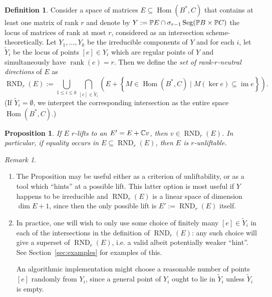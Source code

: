 \documentclass[a4paper,10pt]{article}
\def\zav#1{\left(#1\right)}
\def\set#1{\left\{#1\right\}}
\DeclareMathOperator{\Hom}{Hom}\let\hom\Hom
\DeclareMathOperator{\rank}{rank}\let\rk\rank
\DeclareMathOperator{\im}{im}
\DeclareMathOperator{\RND}{RND}
\DeclareMathOperator{\Seg}{Seg}
\def\uv#1{``#1''}
\newtheorem{prop}[theorem]{Proposition}
\theoremstyle{definition}
\newtheorem{definition}[theorem]{Definition}
\theoremstyle{remark}
\newtheorem*{remark}{Remark}
\begin{document}
\begin{definition}
    Consider a space of matrices $E\subseteq \Hom(B^*,C)$ that contains at least one matrix of rank $r$ and denote by $Y:= \pe E\cap\sigma_{r-1}\Seg(\pe B\times\pe C)$ the locus of matrices of rank at most $r$, considered as an intersection scheme-theoretically. Let $Y_1,\dots, Y_k$ be the irreducible components of $Y$ and for each $i$, let $\tilde Y_i$ be the locus of points $[e]\in Y_i$ which are regular points of $Y$ and simultaneously have $\rank(e) = r$.  Then we define the \emph{set of rank-$r$-neutral directions} of $E$ as
    \[
        \RND_r(E) := \bigcup_{1\leq i\leq k} \bigcap_{[e]\in \tilde Y_i} \zav{E + \set{M\in \Hom(B^*,C)\mid M(\ker e)\subseteq \im e}}.
    \]
    (If $\tilde Y_i=\emptyset$, we interpret the corresponding intersection as the entire space $\Hom(B^*,C)$.)
\end{definition}
%
\begin{prop}
    \label{prp:main-liftability}
    If $E$ $r$-lifts to an $E'=E+\ce v$, then $v\in \RND_r(E)$. In particular, if equality occurs in  $E\subseteq \RND_r(E)$, then $E$ is $r$-unliftable.
\end{prop}
\begin{remark}
    \begin{enumerate}
        \item The Proposition may be useful either as a criterion of unliftability, or as a tool which \uv{hints} at a possible lift. This latter option is most useful if $Y$ happens to be irreducible and $\RND_r(E)$ is a linear space of dimension $\dim E+1$, since then the only possible lift is $E':=\RND_r(E)$ itself.
        \item In practice, one will wish to only use some choice of finitely many $[e]\in\tilde Y_i$ in each of the intersections in the definition of $\RND_r(E)$: any such choice will give a superset of $\RND_r(E)$, i.e. a valid albeit potentially weaker \uv{hint}. See Section~\ref{sec:examples} for examples of this.

        An algorithmic implementation might choose a reasonable number of points $[e]$ randomly from $Y_i$, since a general point of $Y_i$ ought to lie in $\tilde Y_i$ unless $\tilde Y_i$ is empty.
    \end{enumerate}
\end{remark}
\end{document}
